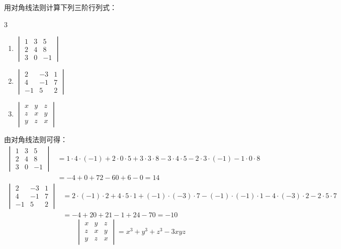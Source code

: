 \begin{example}
    用对角线法则计算下列三阶行列式：
\begin{multicols}{3}
\begin{enumerate}
    \item $\begin{vmatrix}
        1&3&5\\2&4&8\\3&0&-1
    \end{vmatrix}$
    \item $\begin{vmatrix}
        2&-3&1\\4&-1&7\\-1&5&2
    \end{vmatrix}$
    \item $\begin{vmatrix}
        x&y&z\\z&x&y\\y&z&x
    \end{vmatrix}$
\end{enumerate} 
\end{multicols}
\end{example}

\begin{solution}
由对角线法则可得：
\[\begin{split}
    \begin{vmatrix}
        1&3&5\\2&4&8\\3&0&-1
    \end{vmatrix}&=1\cdot 4\cdot (-1)+2\cdot 0\cdot 5+3\cdot 3\cdot8-3\cdot4\cdot5-2\cdot 3\cdot (-1)-1\cdot 0\cdot 8\\
    &=-4+0+72-60+6-0=14
\end{split}\]
\[\begin{split}
    \begin{vmatrix}
        2&-3&1\\4&-1&7\\-1&5&2
    \end{vmatrix}&=2\cdot(-1)\cdot2+4\cdot5\cdot1+(-1)\cdot(-3)\cdot7-(-1)\cdot(-1)\cdot1-4\cdot(-3)\cdot2-2\cdot5\cdot7\\
    &=-4+20+21-1+24-70=-10
\end{split}\]
\[\begin{vmatrix}
    x&y&z\\z&x&y\\y&z&x
\end{vmatrix}=x^3+y^3+z^3-3xyz\]
\end{solution}

